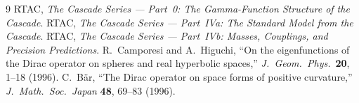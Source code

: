 \documentclass[12pt,a4paper]{article}
\begin{document}
\begin{thebibliography}{9}
 RTAC, \textit{The Cascade Series --- Part~0:
The Gamma-Function Structure of the Cascade}.
 RTAC, \textit{The Cascade Series --- Part~IVa:
The Standard Model from the Cascade}.
 RTAC, \textit{The Cascade Series --- Part~IVb:
Masses, Couplings, and Precision Predictions}.
 R.~Camporesi and A.~Higuchi,
``On the eigenfunctions of the Dirac operator on spheres and real
hyperbolic spaces,'' \textit{J.~Geom.~Phys.}\ \textbf{20},
1--18 (1996).
 C.~B\"ar, ``The Dirac operator on space forms of
positive curvature,'' \textit{J.~Math.~Soc.~Japan} \textbf{48},
69--83 (1996).
\end{thebibliography}
\end{document}
